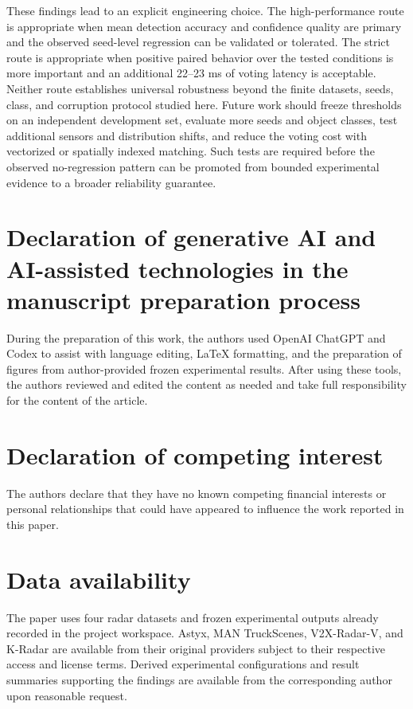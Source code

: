 \documentclass[final,5p,times]{elsarticle}
\begin{document}
These findings lead to an explicit engineering choice. The high-performance
route is appropriate when mean detection accuracy and confidence quality are
primary and the observed seed-level regression can be validated or tolerated.
The strict route is appropriate when positive paired behavior over the tested
conditions is more important and an additional 22--23 ms of voting latency is
acceptable. Neither route establishes universal robustness beyond the finite
datasets, seeds, class, and corruption protocol studied here. Future work
should freeze thresholds on an independent development set, evaluate more
seeds and object classes, test additional sensors and distribution shifts, and
reduce the voting cost with vectorized or spatially indexed matching. Such
tests are required before the observed no-regression pattern can be promoted
from bounded experimental evidence to a broader reliability guarantee.

\section*{Declaration of generative AI and AI-assisted technologies in the
manuscript preparation process}

During the preparation of this work, the authors used OpenAI ChatGPT and Codex
to assist with language editing, LaTeX formatting, and the preparation of
figures from author-provided frozen experimental results. After using these
tools, the authors reviewed and edited the content as needed and take full
responsibility for the content of the article.

\section*{Declaration of competing interest}

The authors declare that they have no known competing financial interests or
personal relationships that could have appeared to influence the work reported
in this paper.

\section*{Data availability}

The paper uses four radar datasets and frozen experimental outputs already
recorded in the project workspace. Astyx, MAN TruckScenes, V2X-Radar-V, and
K-Radar are available from their original providers subject to their
respective access and license terms. Derived experimental configurations and
result summaries supporting the findings are available from the corresponding
author upon reasonable request.


\end{document}
